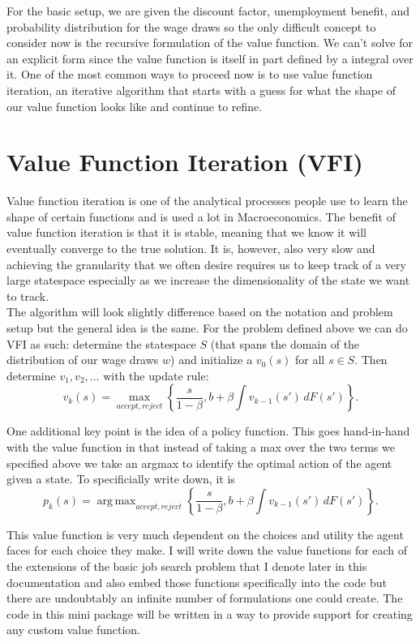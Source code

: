 \documentclass[11pt,english]{article}
\DeclareMathOperator*{\argmax}{arg\,max}
\begin{document}
\noindent For the basic setup, we are given the discount factor, unemployment benefit, and probability distribution for the wage draws so the only difficult concept to consider now is the recursive formulation of the value function. We can't solve for an explicit form since the value function is itself in part defined by a integral over it. One of the most common ways to proceed now is to use value function iteration, an iterative algorithm that starts with a guess for what the shape of our value function looks like and continue to refine.

\section{Value Function Iteration (VFI)}

Value function iteration is one of the analytical processes people use to learn the shape of certain functions and is used a lot in Macroeconomics. The benefit of value function iteration is that it is stable, meaning that we know it will eventually converge to the true solution. It is, however, also very slow and achieving the granularity that we often desire requires us to keep track of a very large statespace especially as we increase the dimensionality of the state we want to track.\\

\noindent The algorithm will look slightly difference based on the notation and problem setup but the general idea is the same. For the problem defined above we can do VFI as such: determine the statespace $S$ (that spans the domain of the distribution of our wage draws $w$) and initialize a $v_0(s)$ for all $s\in S$. Then determine $v_1, v_2, \ldots$ with the update rule: $$v_k(s) = \max_{accept, reject}\left\{\frac{s}{1-\beta},b + \beta\int v_{k-1}(s')\,dF(s')\right\}.$$

\noindent One additional key point is the idea of a policy function. This goes hand-in-hand with the value function in that instead of taking a max over the two terms we specified above we take an argmax to identify the optimal action of the agent given a state. To specificially write down, it is $$p_k(s) = \argmax_{accept, reject}\left\{\frac{s}{1-\beta},b + \beta\int v_{k-1}(s')\,dF(s')\right\}.$$

\noindent This value function is very much dependent on the choices and utility the agent faces for each choice they make. I will write down the value functions for each of the extensions of the basic job search problem that I denote later in this documentation and also embed those functions specifically into the code but there are undoubtably an infinite number of formulations one could create. The code in this mini package will be written in a way to provide support for creating any custom value function.
\end{document}
